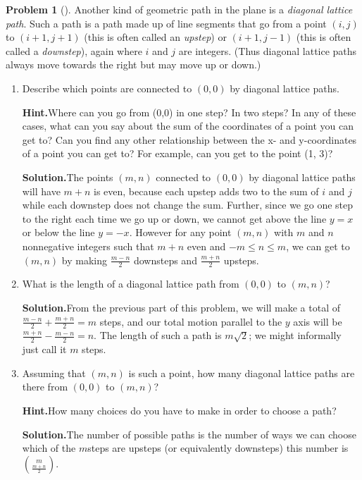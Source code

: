 \documentclass[10pt,]{book}
\theoremstyle{plain}
\theoremstyle{definition}
\newtheorem{activity}[project]{Problem}
\theoremstyle{definition}
\numberwithin{equation}{chapter}
\begin{document}
\begin{activity}[]\label{diagonallattice}
Another kind of geometric path in the plane is a \emph{diagonal lattice path}. Such a path is a path made up of line segments that go from a point \((i,j)\) to \((i+1,j+1)\) (this is often called an \emph{upstep}) or \((i+1,j-1)\) (this is often called a \emph{downstep}), again where \(i\) and \(j\) are integers. (Thus diagonal lattice paths always move towards the right but may move up or down.)%
\begin{enumerate}[font=\bfseries,label=(\alph*),ref=\alph*]
\item\label{task-46} Describe which points are connected to \((0,0)\) by diagonal lattice paths.%
\par\medskip\noindent%
\textbf{Hint.}\quad Where can you go from (0,0) in one step? In two steps? In any of these cases, what can you say about the sum of the coordinates of a point you can get to? Can you find any other relationship between the x- and y-coordinates of a point you can get to? For example, can you get to the point (1, 3)?%
\par\medskip\noindent%
\textbf{Solution.}\quad The points \((m,n)\) connected to \((0,0)\) by diagonal lattice paths will have \(m+n\) is even, because each upstep adds two to the sum of \(i\) and \(j\) while each downstep does not change the sum.  Further, since we go one step to the right each time we go up or down, we cannot get above the line \(y=x\) or below the line \(y=-x\). However for any point \((m,n)\) with \(m\) and \(n\) nonnegative integers such that \(m+n\) even and \(-m\le n\le m\), we can get to \((m,n)\) by making \(\frac{m-n}{2}\) downsteps and \(\frac{m+n}{2}\) upsteps.%
\item\label{task-47} What is the length of a diagonal lattice path from \((0,0)\) to \((m,n)\)?%
\par\medskip\noindent%
\textbf{Solution.}\quad From the previous part of this problem, we will make a total of  \(\frac{m-n}{2} + \frac{m+n}{2} = m\) steps, and our total motion parallel to the \(y\) axis will be \(\frac{m+n}{2}-\frac{m-n}{2} = n\).  The length of such a path is \(m\sqrt{2}\); we might informally just call it \(m\) steps.%
\item\label{task-48} Assuming that \((m,n)\) is such a point, how many diagonal lattice paths are there from \((0,0)\) to \((m,n)\)?%
\par\medskip\noindent%
\textbf{Hint.}\quad How many choices do you have to make in order to choose a path?%
\par\medskip\noindent%
\textbf{Solution.}\quad The number of possible paths is the number of ways we can choose which of the \(m\)steps are upsteps (or equivalently downsteps) this number is \(\binom{m}{\frac{m+n}{2}}\).%
\end{enumerate}
\end{activity}
\end{document}
